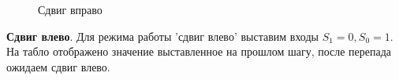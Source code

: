 \begin{figure}[H]
    \centering
    \hspace{40mm}
    \caption{Сдвиг вправо}
\end{figure}

\textbf{Сдвиг влево}. Для режима работы 'сдвиг влево' выставим входы $S_1=0,S_0=1$. На табло отображено
значение выставленное на прошлом шагу, после перепада ожидаем сдвиг влево.

